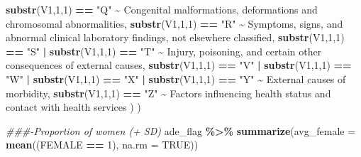 \documentclass[preprint, 3p,
authoryear]{elsarticle} %
\newenvironment{Shaded}{\begin{snugshade}}{\end{snugshade}}
\newcommand{\CommentTok}[1]{\textcolor[rgb]{0.56,0.35,0.01}{\textit{#1}}}
\newcommand{\DataTypeTok}[1]{\textcolor[rgb]{0.13,0.29,0.53}{#1}}
\newcommand{\DecValTok}[1]{\textcolor[rgb]{0.00,0.00,0.81}{#1}}
\newcommand{\KeywordTok}[1]{\textcolor[rgb]{0.13,0.29,0.53}{\textbf{#1}}}
\newcommand{\NormalTok}[1]{#1}
\newcommand{\OperatorTok}[1]{\textcolor[rgb]{0.81,0.36,0.00}{\textbf{#1}}}
\newcommand{\OtherTok}[1]{\textcolor[rgb]{0.56,0.35,0.01}{#1}}
\newcommand{\StringTok}[1]{\textcolor[rgb]{0.31,0.60,0.02}{#1}}
\begin{document}
\begin{Shaded}
\begin{Highlighting}[]
                              \KeywordTok{substr}\NormalTok{(V1,}\DecValTok{1}\NormalTok{,}\DecValTok{1}\NormalTok{) }\OperatorTok{==}\StringTok{ "Q"} \OperatorTok{\textasciitilde{}}\StringTok{ \textquotesingle{}Congenital malformations, deformations and chromosomal abnormalities\textquotesingle{}}\NormalTok{,}
                              \KeywordTok{substr}\NormalTok{(V1,}\DecValTok{1}\NormalTok{,}\DecValTok{1}\NormalTok{) }\OperatorTok{==}\StringTok{ "R"} \OperatorTok{\textasciitilde{}}\StringTok{ \textquotesingle{}Symptoms, signs, and abnormal clinical laboratory findings, not elsewhere classified\textquotesingle{}}\NormalTok{,}
                              \KeywordTok{substr}\NormalTok{(V1,}\DecValTok{1}\NormalTok{,}\DecValTok{1}\NormalTok{) }\OperatorTok{==}\StringTok{ "S"} \OperatorTok{|}\StringTok{ }\KeywordTok{substr}\NormalTok{(V1,}\DecValTok{1}\NormalTok{,}\DecValTok{1}\NormalTok{) }\OperatorTok{==}\StringTok{ "T"} \OperatorTok{\textasciitilde{}}\StringTok{ \textquotesingle{}Injury, poisoning, and certain other consequences of external causes\textquotesingle{}}\NormalTok{,}
                              \KeywordTok{substr}\NormalTok{(V1,}\DecValTok{1}\NormalTok{,}\DecValTok{1}\NormalTok{) }\OperatorTok{==}\StringTok{ "V"} \OperatorTok{|}\StringTok{ }\KeywordTok{substr}\NormalTok{(V1,}\DecValTok{1}\NormalTok{,}\DecValTok{1}\NormalTok{) }\OperatorTok{==}\StringTok{ "W"} \OperatorTok{|}\StringTok{ }\KeywordTok{substr}\NormalTok{(V1,}\DecValTok{1}\NormalTok{,}\DecValTok{1}\NormalTok{) }\OperatorTok{==}\StringTok{ "X"} \OperatorTok{|}\StringTok{ }\KeywordTok{substr}\NormalTok{(V1,}\DecValTok{1}\NormalTok{,}\DecValTok{1}\NormalTok{) }\OperatorTok{==}\StringTok{ "Y"} \OperatorTok{\textasciitilde{}}\StringTok{ \textquotesingle{}External causes of morbidity\textquotesingle{}}\NormalTok{,}
                              \KeywordTok{substr}\NormalTok{(V1,}\DecValTok{1}\NormalTok{,}\DecValTok{1}\NormalTok{) }\OperatorTok{==}\StringTok{ "Z"} \OperatorTok{\textasciitilde{}}\StringTok{ \textquotesingle{}Factors influencing health status and contact with health services\textquotesingle{}}
\NormalTok{                             )}
\NormalTok{         )}
\end{Highlighting}
\end{Shaded}

\begin{Shaded}
\begin{Highlighting}[]
\CommentTok{\#\#\#{-}Proportion of women (+ SD) }
\NormalTok{ade\_flag }\OperatorTok{\%\textgreater{}\%}
\StringTok{    }\KeywordTok{summarize}\NormalTok{(}\DataTypeTok{avg\_female =} \KeywordTok{mean}\NormalTok{((FEMALE }\OperatorTok{==}\StringTok{ }\DecValTok{1}\NormalTok{), }\DataTypeTok{na.rm =} \OtherTok{TRUE}\NormalTok{))}
\end{Highlighting}
\end{Shaded}
\end{document}
